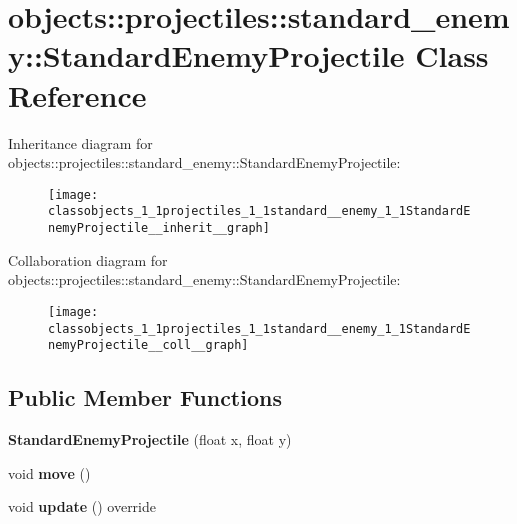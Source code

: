 \hypertarget{classobjects_1_1projectiles_1_1standard__enemy_1_1StandardEnemyProjectile}{}\section{objects\+:\+:projectiles\+:\+:standard\+\_\+enemy\+:\+:Standard\+Enemy\+Projectile Class Reference}
\label{classobjects_1_1projectiles_1_1standard__enemy_1_1StandardEnemyProjectile}


Inheritance diagram for objects\+:\+:projectiles\+:\+:standard\+\_\+enemy\+:\+:Standard\+Enemy\+Projectile\+:\nopagebreak
\begin{figure}[H]
\begin{center}
\leavevmode
\texttt{[image: classobjects\_1\_1projectiles\_1\_1standard\_\_enemy\_1\_1StandardEnemyProjectile\_\_inherit\_\_graph]}
\end{center}
\end{figure}


Collaboration diagram for objects\+:\+:projectiles\+:\+:standard\+\_\+enemy\+:\+:Standard\+Enemy\+Projectile\+:\nopagebreak
\begin{figure}[H]
\begin{center}
\leavevmode
\texttt{[image: classobjects\_1\_1projectiles\_1\_1standard\_\_enemy\_1\_1StandardEnemyProjectile\_\_coll\_\_graph]}
\end{center}
\end{figure}
\subsection*{Public Member Functions}
\begin{DoxyCompactItemize}
\item 
\mbox{\label{classobjects_1_1projectiles_1_1standard__enemy_1_1StandardEnemyProjectile_abc3abd0c8b7d2ff776bf55ab04be67c3}}
{\bfseries Standard\+Enemy\+Projectile} (float x, float y)
\item 
\mbox{\label{classobjects_1_1projectiles_1_1standard__enemy_1_1StandardEnemyProjectile_a8a5890e9986800df9870c26c83950743}}
void {\bfseries move} ()
\item 
\mbox{\label{classobjects_1_1projectiles_1_1standard__enemy_1_1StandardEnemyProjectile_a9c48f6f68fddcd9d9e7c5a610eba2af8}}
void {\bfseries update} () override
\end{DoxyCompactItemize}

